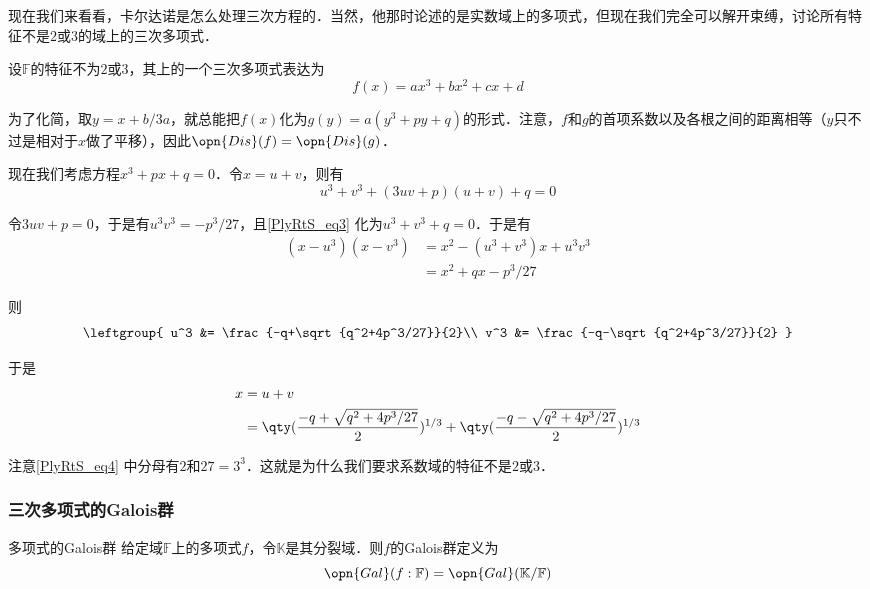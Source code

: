 现在我们来看看，卡尔达诺是怎么处理三次方程的．当然，他那时论述的是实数域上的多项式，但现在我们完全可以解开束缚，讨论所有特征不是$2$或$3$的域上的三次多项式．

设$\mathbb{F}$的特征不为$2$或$3$，其上的一个三次多项式表达为
\begin{equation}
f(x) = ax^3+bx^2+cx+d
\end{equation}

为了化简，取$y=x+b/3a$，就总能把$f(x)$化为$g(y)=a(y^3+py+q)$的形式．注意，$f$和$g$的首项系数以及各根之间的距离相等（$y$只不过是相对于$x$做了平移），因此$\opn{Dis}(f)=\opn{Dis}(g)$．

现在我们考虑方程$x^3+px+q=0$．令$x=u+v$，则有
\begin{equation}\label{PlyRtS_eq3}
u^3+v^3+(3uv+p)(u+v)+q=0
\end{equation}

令$3uv+p=0$，于是有$u^3v^3=-p^3/27$，且\autoref{PlyRtS_eq3} 化为$u^3+v^3+q=0$．于是有
\begin{equation}
\begin{aligned}
(x-u^3)(x-v^3) &= x^2-(u^3+v^3)x+u^3v^3\\
&= x^2+qx-p^3/27
\end{aligned}
\end{equation}

则
\begin{equation}
\leftgroup{
    u^3 &= \frac{-q+\sqrt{q^2+4p^3/27}}{2}\\
    v^3 &= \frac{-q-\sqrt{q^2+4p^3/27}}{2}
}
\end{equation}

于是
\begin{equation}\label{PlyRtS_eq4}
\begin{aligned}
x&=u+v\\
&=\qty(\frac{-q+\sqrt{q^2+4p^3/27}}{2})^{1/3}+\qty(\frac{-q-\sqrt{q^2+4p^3/27}}{2})^{1/3}
\end{aligned}
\end{equation}

注意\autoref{PlyRtS_eq4} 中分母有$2$和$27=3^3$．这就是为什么我们要求系数域的特征不是$2$或$3$．






\subsubsection{三次多项式的Galois群}


\begin{definition}{多项式的Galois群}
给定域$\mathbb{F}$上的多项式$f$，令$\mathbb{K}$是其分裂域．则$f$的Galois群定义为
\begin{equation}
\opn{Gal}(f:\mathbb{F})=\opn{Gal}(\mathbb{K}/\mathbb{F})
\end{equation}
\end{definition}


